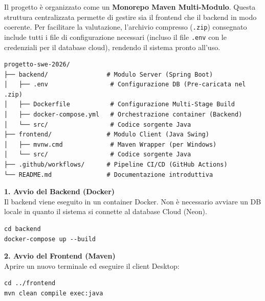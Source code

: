 \documentclass[a4paper,12pt]{article}
\begin{document}
Il progetto è organizzato come un \textbf{Monorepo Maven Multi-Modulo}. Questa struttura centralizzata permette di gestire sia il frontend che il backend in modo coerente.
Per facilitare la valutazione, l'archivio compresso (\texttt{.zip}) consegnato include tutti i file di configurazione necessari (incluso il file \texttt{.env} con le credenziali per il database cloud), rendendo il sistema pronto all'uso.

\begin{tcolorbox}[
    enhanced,
    colback=white,
    colframe=UninaBlue,
    boxrule=0.8pt,
    arc=3pt,
    sharp corners,
    title=Struttura della Directory,
    fonttitle=\bfseries,
    coltitle=white,
    breakable
]
\small
\begin{verbatim}
progetto-swe-2026/
├── backend/                # Modulo Server (Spring Boot)
│   ├── .env                 # Configurazione DB (Pre-caricata nel .zip)
│   ├── Dockerfile           # Configurazione Multi-Stage Build
│   ├── docker-compose.yml   # Orchestrazione container (Backend)
│   └── src/                 # Codice sorgente Java
├── frontend/               # Modulo Client (Java Swing)
│   ├── mvnw.cmd             # Maven Wrapper (per Windows)
│   └── src/                 # Codice sorgente Java
├── .github/workflows/      # Pipeline CI/CD (GitHub Actions)
└── README.md               # Documentazione introduttiva
\end{verbatim}
\end{tcolorbox}

\begin{tcolorbox}[
    enhanced,
    colback=BoxLight,
    colframe=UninaBlue,
    boxrule=0.8pt,
    arc=3pt,
    sharp corners,
    title=Istruzioni per Build ed Esecuzione,
    fonttitle=\bfseries,
    coltitle=white,
    breakable
]

\vspace{0.3cm}
\textbf{1. Avvio del Backend (Docker)} \\
Il backend viene eseguito in un container Docker. Non è necessario avviare un DB locale in quanto il sistema si connette al database Cloud (Neon).
\begin{tcolorbox}[colback=black!85, colupper=white, boxrule=0pt, arc=2pt, left=2mm, top=1mm, bottom=1mm]
\small
\begin{verbatim}
cd backend
docker-compose up --build
\end{verbatim}
\end{tcolorbox}

\vspace{0.3cm}
\textbf{2. Avvio del Frontend (Maven)} \\
Aprire un nuovo terminale ed eseguire il client Desktop:
\begin{tcolorbox}[colback=black!85, colupper=white, boxrule=0pt, arc=2pt, left=2mm, top=1mm, bottom=1mm]
\small
\begin{verbatim}
cd ../frontend
mvn clean compile exec:java
\end{verbatim}
\end{tcolorbox}
\end{tcolorbox}
\end{document}
